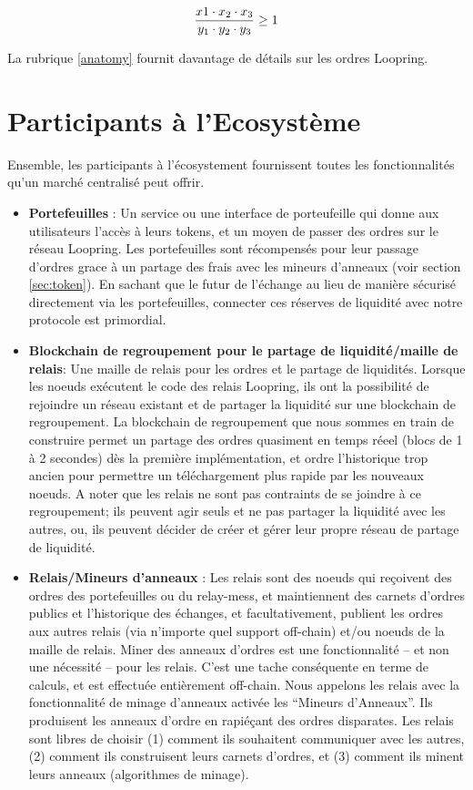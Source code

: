 \documentclass[UTF8,nofonts]{article}
\begin{document}
\begin{multicols}{2}
\begin{equation}
{{x1 \cdot x_2 \cdot x_3 \over y_1 \cdot y_2 \cdot y_3} \geq 1}
\end{equation}


La rubrique \ref{anatomy} fournit davantage de détails sur les ordres Loopring.


\section{Participants à l'Ecosystème\label{sec:ecosystem}}
Ensemble, les participants à l'écosystement fournissent toutes les fonctionnalités qu'un marché centralisé peut offrir. 

\begin{itemize}

\item \textbf{Portefeuilles} : Un service ou une interface de porteufeille qui donne aux utilisateurs l'accès à leurs tokens, et un moyen de passer des ordres sur le réseau Loopring. Les portefeuilles sont récompensés pour leur passage d'ordres grace à un partage des frais avec les mineurs d'anneaux (voir section \ref{sec:token}). En sachant que le futur de l'échange au lieu de manière sécurisé directement via les portefeuilles, connecter ces réserves de liquidité avec notre protocole est primordial.

\item \textbf{Blockchain de regroupement pour le partage de liquidité/maille de relais}: Une maille de relais pour les ordres et le partage de liquidités. Lorsque les noeuds exécutent le code des relais Loopring, ils ont la possibilité de rejoindre un réseau existant et de partager la liquidité sur une blockchain de regroupement. La blockchain de regroupement que nous sommes en train de construire permet un partage des ordres quasiment en temps réeel (blocs de 1 à 2 secondes) dès la première implémentation, et ordre l'historique trop ancien pour permettre un téléchargement plus rapide par les nouveaux noeuds. A noter que les relais ne sont pas contraints de se joindre à ce regroupement; ils peuvent agir seuls et ne pas partager la liquidité avec les autres, ou, ils peuvent décider de créer et gérer leur propre réseau de partage de liquidité.

\item \textbf{Relais/Mineurs d'anneaux} : Les relais sont des noeuds qui reçoivent des ordres des portefeuilles ou du relay-mess, et maintiennent des carnets d'ordres publics et l'historique des échanges, et facultativement, publient les ordres aux autres relais (via n'importe quel support off-chain) et/ou noeuds de la maille de relais. Miner des anneaux d'ordres est une fonctionnalité -- et non une nécessité -- pour les relais. C'est une tache conséquente en terme de calculs, et est effectuée entièrement off-chain. Nous appelons les relais avec la fonctionnalité de minage d'anneaux activée les \enquote{Mineurs d'Anneaux}. Ils produisent les anneaux d'ordre en rapiéçant des ordres disparates. Les relais sont libres de choisir (1) comment ils souhaitent communiquer avec les autres, (2) comment ils construisent leurs carnets d'ordres, et (3) comment ils minent leurs anneaux (algorithmes de minage).


\end{itemize}
\end{multicols}
\end{document}
